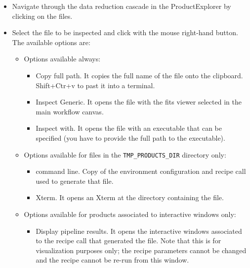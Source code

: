 \begin{itemize}

\item Navigate through the data reduction cascade in the
  ProductExplorer by clicking on the files.

 \item Select the file to be inspected and click with the mouse right-hand button. 
   The available options are:
   \begin{itemize}
    \item Options available always:
      \begin{itemize}
        \item Copy full path. It copies the full name of the file onto the
          clipboard. Shift+Ctr+v to past it into a terminal.

        \item Inspect Generic. It opens the file with the fits viewer
          selected in the main workflow canvas.

        \item Inspect with. It opens the file with an executable that can
          be specified (you have to provide the full path to the
          executable).
      \end{itemize}

   \item  Options available for files in the {\tt TMP\_PRODUCTS\_DIR} directory only:
      \begin{itemize}
        \item  command line. Copy of the environment configuration and recipe
        call used to generate that file.
        \item Xterm. It opens an Xterm at the directory containing the file.
     \end{itemize}
   \item  Options available for products associated to interactive windows only:
      \begin{itemize}
       \item Display pipeline results. It opens the interactive windows associated
        to the recipe call that generated the file. Note that this is for
        visualization purposes only; the recipe parameters cannot be
        changed and the recipe cannot be re-run from this window.

      \end{itemize}
      \end{itemize}
      \end{itemize}
